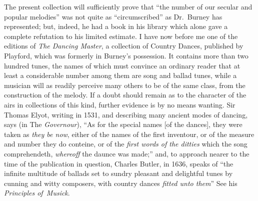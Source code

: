 The present collection will sufficiently prove that “the number of our secular
and popular melodies” was not quite as “circumscribed” as Dr.~Burney has
represented; but, indeed, he had a book in his library which alone gave a complete
refutation to his limited estimate. I have now before me one of the editions
of \textit{The Dancing Master}, a collection of Country Dances, published by Playford,
which was formerly in Burney’s possession. It contains more than two hundred
tunes, the names of which must convince an ordinary reader that at least a considerable
number among them are song and ballad tunes, while a musician will as
readily perceive many others to be of the same class, from the construction of
the melody. If a doubt should remain as to the character of the airs in collections
of this kind, further evidence is by no means wanting. Sir Thomas Elyot, writing
in 1531, and describing many ancient modes of dancing, says (in The \textit{Governour}),
“As for the special names [of the dances], they were taken as \textit{they be now}, either
of the names of the first inventour, or of the measure and number they do conteine,
or of the \textit{first words of the ditties} which the song comprehendeth, \textit{whereoff}
the daunce was made;” and, to approach nearer to the time of the publication in
question, Charles Butler, in 1636, speaks of “the infinite multitude of ballads
set to sundry pleasant and delightful tunes by cunning and witty composers, with
country dances \textit{fitted unto them}” See his \textit{Principles of~Musick}.

